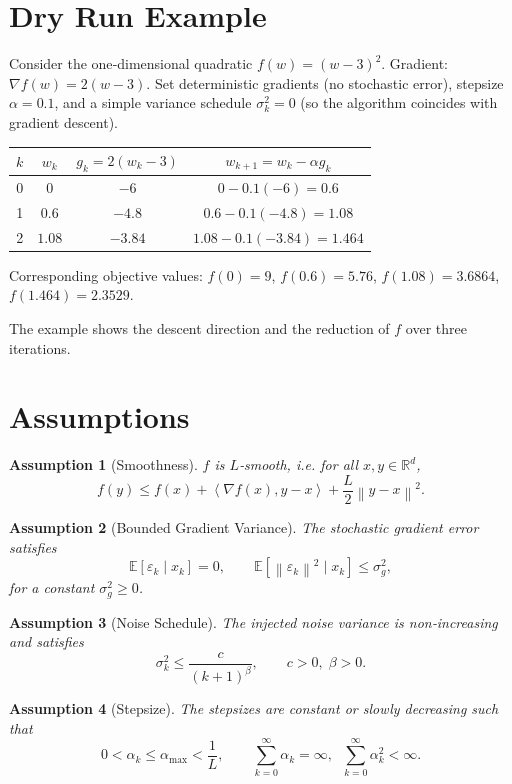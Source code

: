 \documentclass{article}
\newtheorem{assumption}{Assumption}
\newcommand{\E}{\mathbb{E}}
\newcommand{\R}{\mathbb{R}}
\newcommand{\norm}[1]{\left\|#1\right\|}
\newcommand{\ip}[2]{\left\langle #1,#2\right\rangle}
\newcommand{\grad}{\nabla}
\begin{document}
\section*{Dry Run Example}
Consider the one‑dimensional quadratic $f(w)=(w-3)^2$.  
Gradient: $\grad f(w)=2(w-3)$.  
Set deterministic gradients (no stochastic error), stepsize $\alpha=0.1$, and a simple variance schedule $\sigma_k^{2}=0$ (so the algorithm coincides with gradient descent).  

\begin{center}
\begin{tabular}{c|c|c|c}
$k$ & $w_k$ & $g_k=2(w_k-3)$ & $w_{k+1}=w_k-\alpha g_k$ \\ \hline
0 & $0$ & $-6$ & $0-0.1(-6)=0.6$ \\
1 & $0.6$ & $-4.8$ & $0.6-0.1(-4.8)=1.08$ \\
2 & $1.08$ & $-3.84$ & $1.08-0.1(-3.84)=1.464$ \\
\end{tabular}
\end{center}
Corresponding objective values: $f(0)=9$, $f(0.6)=5.76$, $f(1.08)=3.6864$, $f(1.464)=2.3529$.  

The example shows the descent direction and the reduction of $f$ over three iterations.

\newpage
\section*{Assumptions}
\begin{assumption}[Smoothness]
$f$ is $L$‑smooth, i.e. for all $x,y\in\R^{d}$,
\[
f(y)\le f(x)+\ip{\grad f(x)}{y-x}+\frac{L}{2}\norm{y-x}^{2}.
\tag{A1}
\]
\end{assumption}
\begin{assumption}[Bounded Gradient Variance]
The stochastic gradient error satisfies
\[
\E[\varepsilon_k\mid x_k]=0,\qquad 
\E[\norm{\varepsilon_k}^{2}\mid x_k]\le \sigma_{g}^{2},
\tag{A2}
\]
for a constant $\sigma_{g}^{2}\ge0$.
\end{assumption}
\begin{assumption}[Noise Schedule]
The injected noise variance is non‑increasing and satisfies
\[
\sigma_k^{2}\le \frac{c}{(k+1)^{\beta}},\qquad c>0,\;\beta>0.
\tag{A3}
\]
\end{assumption}
\begin{assumption}[Stepsize]
The stepsizes are constant or slowly decreasing such that
\[
0<\alpha_k\le \alpha_{\max}<\frac{1}{L},\qquad 
\sum_{k=0}^{\infty}\alpha_k=\infty,\;\;
\sum_{k=0}^{\infty}\alpha_k^{2}<\infty .
\tag{A4}
\]
\end{assumption}
\end{document}
